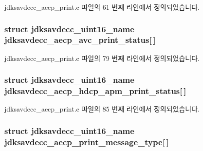 jdksavdecc\+\_\+aecp\+\_\+print.\+c 파일의 61 번째 라인에서 정의되었습니다.

\subsubsection[{\texorpdfstring{jdksavdecc\+\_\+aecp\+\_\+avc\+\_\+print\+\_\+status}{jdksavdecc_aecp_avc_print_status}}]{\setlength{\rightskip}{0pt plus 5cm}struct {\bf jdksavdecc\+\_\+uint16\+\_\+name} jdksavdecc\+\_\+aecp\+\_\+avc\+\_\+print\+\_\+status\mbox{[}$\,$\mbox{]}}\hypertarget{group__aecp__print_ga1d0387b1ab44b2bc836c369130ad7d7a}{}\label{group__aecp__print_ga1d0387b1ab44b2bc836c369130ad7d7a}


jdksavdecc\+\_\+aecp\+\_\+print.\+c 파일의 79 번째 라인에서 정의되었습니다.

\subsubsection[{\texorpdfstring{jdksavdecc\+\_\+aecp\+\_\+hdcp\+\_\+apm\+\_\+print\+\_\+status}{jdksavdecc_aecp_hdcp_apm_print_status}}]{\setlength{\rightskip}{0pt plus 5cm}struct {\bf jdksavdecc\+\_\+uint16\+\_\+name} jdksavdecc\+\_\+aecp\+\_\+hdcp\+\_\+apm\+\_\+print\+\_\+status\mbox{[}$\,$\mbox{]}}\hypertarget{group__aecp__print_gabd6228d42e89612d3e6f1753949893e6}{}\label{group__aecp__print_gabd6228d42e89612d3e6f1753949893e6}


jdksavdecc\+\_\+aecp\+\_\+print.\+c 파일의 85 번째 라인에서 정의되었습니다.

\subsubsection[{\texorpdfstring{jdksavdecc\+\_\+aecp\+\_\+print\+\_\+message\+\_\+type}{jdksavdecc_aecp_print_message_type}}]{\setlength{\rightskip}{0pt plus 5cm}struct {\bf jdksavdecc\+\_\+uint16\+\_\+name} jdksavdecc\+\_\+aecp\+\_\+print\+\_\+message\+\_\+type\mbox{[}$\,$\mbox{]}}\hypertarget{group__aecp__print_gafc0c0a93f044f415ebcc499d3d7119a5}{}\label{group__aecp__print_gafc0c0a93f044f415ebcc499d3d7119a5}


